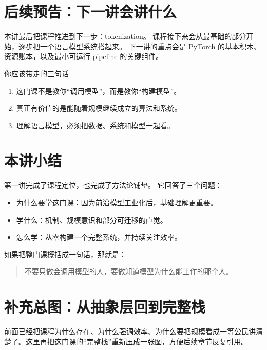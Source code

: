 \documentclass[a4paper]{article}
\begin{document}
\section{后续预告：下一讲会讲什么}

本讲最后把课程推进到下一步：tokenization。
课程接下来会从最基础的部分开始，逐步把一个语言模型系统搭起来。
下一讲的重点会是 PyTorch 的基本积木、资源账本，以及最小可运行 pipeline 的关键组件。

\begin{warningbox}{你应该带走的三句话}
\begin{enumerate}
    \item 这门课不是教你“调用模型”，而是教你“构建模型”。
    \item 真正有价值的是能随着规模继续成立的算法和系统。
    \item 理解语言模型，必须把数据、系统和模型一起看。
\end{enumerate}
\end{warningbox}

\section{本讲小结}

第一讲完成了课程定位，也完成了方法论铺垫。
它回答了三个问题：
\begin{itemize}
    \item 为什么要学这门课：因为前沿模型工业化后，基础理解更重要。
    \item 学什么：机制、规模意识和部分可迁移的直觉。
    \item 怎么学：从零构建一个完整系统，并持续关注效率。
\end{itemize}

如果把整门课概括成一句话，那就是：
\begin{quote}
不要只做会调用模型的人，要做知道模型为什么能工作的那个人。
\end{quote}

\section{补充总图：从抽象层回到完整栈}

前面已经把课程为什么存在、为什么强调效率、为什么要把规模看成一等公民讲清楚了。这里再把这门课的“完整栈”重新压成一张图，方便后续章节反复引用。
\end{document}
